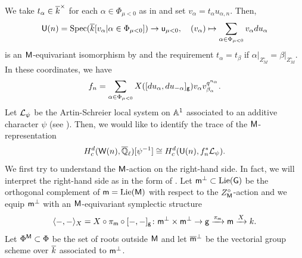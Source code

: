 \documentclass[12pt,reqno]{amsart}
\begin{document}
We take $t_\alpha \in {\overline{k}}^\times$ for each $\alpha \in \Phi_{\mu < 0}$ as in  and set $v_{\alpha} = t_\alpha u_{\alpha, n}$. Then, 
\[
    {\mathsf{U}}(n) = {\operatorname{Spec}}({\overline{k}}[v_\alpha \vert \alpha \in \Phi_{\mu < 0}]) \to {\mathsf{u}}_{\mu < 0} ,\quad (v_\alpha) \mapsto \sum_{\alpha \in \Phi_{\mu < 0}} v_\alpha du_\alpha
\]
is an ${\mathsf{M}}$-equivariant isomorphism by  and the requirement $t_\alpha = t_\beta$ if $\alpha\vert_{Z_M^\circ} = \beta\vert_{Z_M^\circ}$. In these coordinates, we have 
\[
    f_n = \sum_{\alpha \in \Phi_{\mu < 0}} X([du_\alpha, du_{-\alpha}]_{{\mathsf{g}}}) v_\alpha v_{\beta_\alpha}^{q^{n_\alpha}}. 
\]
Let ${\mathcal{L}}_\psi$ be the Artin-Schreier local system on $\mathbb{A}^1$ associated to an additive character $\psi$ (see \cite[Section 4.1]{Tak26_Yu}). Then, we would like to identify the trace of the ${\mathsf{M}}$-representation 
\[
    H_c^d({\mathsf{W}}(n), {\overline{\mathbb{Q}}_\ell})[\psi^{-1}] \cong H_c^d({\mathsf{U}}(n), f_n^*{\mathcal{L}}_{\psi}). 
\]
We first try to understand the ${\mathsf{M}}$-action on the right-hand side. In fact, we will interpret the right-hand side as in the form of \cite[Proposition 4.15]{Tak26_Yu}. Let ${\mathsf{m}}^\perp \subset {\operatorname{Lie}}({\mathsf{G}})$ be the orthogonal complement of ${\mathsf{m}} = {\operatorname{Lie}}({\mathsf{M}})$ with respect to the $Z_{{\mathsf{M}}}^\circ$-action and we equip ${\mathsf{m}}^\perp$ with an ${\mathsf{M}}$-equivariant symplectic structure 
\[
    \langle -, - \rangle_X = X \circ \pi_{{\mathsf{m}}} \circ [-, -]_{{\mathsf{g}}} \colon {\mathsf{m}}^\perp \times {\mathsf{m}}^\perp \to {\mathsf{g}} \xrightarrow{\pi_{{\mathsf{m}}}} {\mathsf{m}} \xrightarrow{X} k. 
\]
Let $\Phi^{{\mathsf{M}}} \subset \Phi$ be the set of roots outside ${\mathsf{M}}$ and let ${\mathsf{{\overline{m}}}}^\perp$ be the vectorial group scheme over ${\overline{k}}$ associated to ${\mathsf{m}}^\perp$.
\end{document}
